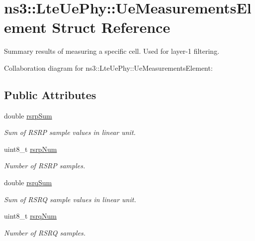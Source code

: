 \hypertarget{structns3_1_1LteUePhy_1_1UeMeasurementsElement}{}\section{ns3\+:\+:Lte\+Ue\+Phy\+:\+:Ue\+Measurements\+Element Struct Reference}
\label{structns3_1_1LteUePhy_1_1UeMeasurementsElement}


Summary results of measuring a specific cell. Used for layer-\/1 filtering.  




Collaboration diagram for ns3\+:\+:Lte\+Ue\+Phy\+:\+:Ue\+Measurements\+Element\+:
\subsection*{Public Attributes}
\begin{DoxyCompactItemize}
\item 
double \hyperlink{structns3_1_1LteUePhy_1_1UeMeasurementsElement_a687cd309102de3124a17a8532b73c98a}{rsrp\+Sum}
\begin{DoxyCompactList}\small\item\em Sum of R\+S\+RP sample values in linear unit. \end{DoxyCompactList}\item 
uint8\+\_\+t \hyperlink{structns3_1_1LteUePhy_1_1UeMeasurementsElement_a5d71d6a4d336c356ac37be2714354290}{rsrp\+Num}
\begin{DoxyCompactList}\small\item\em Number of R\+S\+RP samples. \end{DoxyCompactList}\item 
double \hyperlink{structns3_1_1LteUePhy_1_1UeMeasurementsElement_a23143f6e7f09461d404cf61facabe72d}{rsrq\+Sum}
\begin{DoxyCompactList}\small\item\em Sum of R\+S\+RQ sample values in linear unit. \end{DoxyCompactList}\item 
uint8\+\_\+t \hyperlink{structns3_1_1LteUePhy_1_1UeMeasurementsElement_ac8f7ca77d98db99d432f1190aeacd77c}{rsrq\+Num}
\begin{DoxyCompactList}\small\item\em Number of R\+S\+RQ samples. \end{DoxyCompactList}\end{DoxyCompactItemize}


